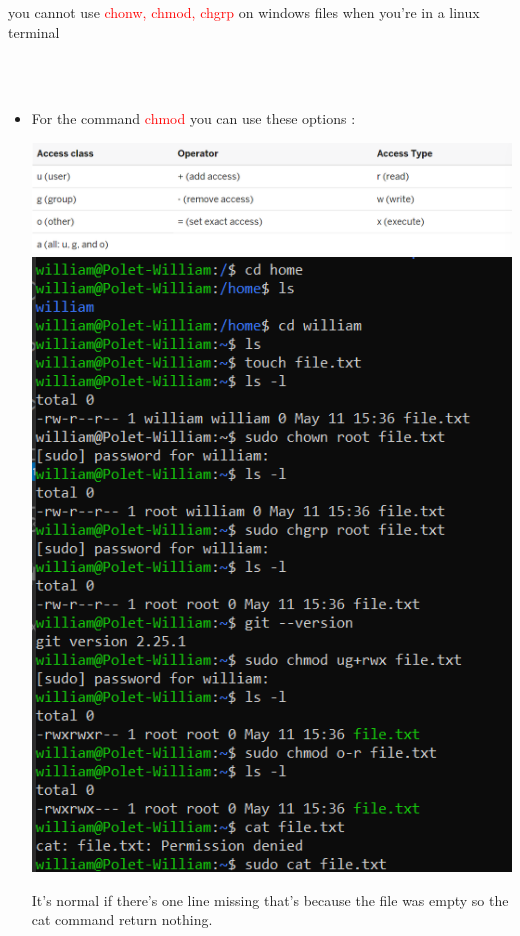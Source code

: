 \documentclass{article}
\begin{document}
\begin{minipage}[c]{0.45\textwidth}
    you cannot use \textcolor{red}{chonw, chmod, chgrp} on windows files when you're in a linux terminal
\end{minipage} \\ \\
\begin{itemize}
    \item For the command \textcolor{red}{chmod} you can use these options : \\
    \begin{center}          
        \includegraphics[scale=0.7]{chmod.png} \\ \vspace{0.3cm}
        \includegraphics[scale=1]{chmodTerminal.png}
    \end{center}
    It's normal if there's one line missing that's because the file was empty so the cat command return nothing.
\end{itemize}
\end{document}
